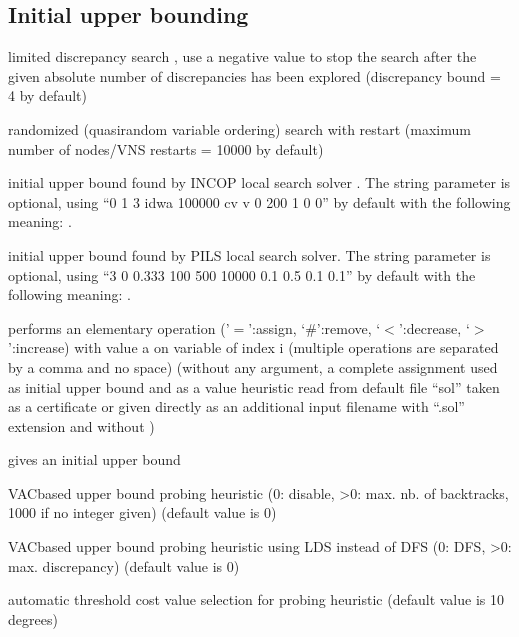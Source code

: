 \documentclass[letterpaper,10pt,openany,oneside,english]{sphinxmanual}
\begin{document}
\subsection{Initial upper bounding}
\label{\detokenize{userdoc:initial-upper-bounding}}\begin{description}
\sphinxAtStartPar
limited discrepancy search , use a negative value to stop the search after the given absolute number of discrepancies has been explored (discrepancy bound = 4 by default)

\sphinxAtStartPar
randomized (quasi\sphinxhyphen{}random variable ordering) search with restart (maximum number of nodes/VNS restarts = 10000 by default)

\sphinxAtStartPar
initial upper bound found by INCOP local search
solver . The string parameter is optional,
using “0 1 3 idwa 100000 cv v 0 200 1 0 0” by default with the
following meaning:
.

\sphinxAtStartPar
initial upper bound found by PILS local search
solver. The string parameter is optional,
using “3 0 0.333 100 500 10000 0.1 0.5 0.1 0.1” by default with the
following meaning:
.

\sphinxAtStartPar
performs an elementary operation (’\(=\)’:assign,
‘\(\#\)’:remove, ‘\(<\)’:decrease, ‘\(>\)’:increase) with
value a on variable of index i (multiple operations are separated by a
comma and no space) (without any
argument, a complete assignment \textendash{} used as initial upper bound and
as a value heuristic \textendash{} read from default file “sol” taken as a
certificate or given directly as an additional input
filename with “.sol” extension and without )

\sphinxAtStartPar
gives an initial upper bound

\sphinxAtStartPar
VAC\sphinxhyphen{}based upper bound probing heuristic (0: disable, \textgreater{}0: max. nb. of
backtracks, 1000 if no integer given) (default value is 0)

\sphinxAtStartPar
VAC\sphinxhyphen{}based upper bound probing heuristic using LDS instead of DFS
(0: DFS, \textgreater{}0: max. discrepancy) (default value is 0)

\sphinxAtStartPar
automatic threshold cost value selection for probing heuristic
(default value is 10 degrees)

\end{description}
\end{document}

